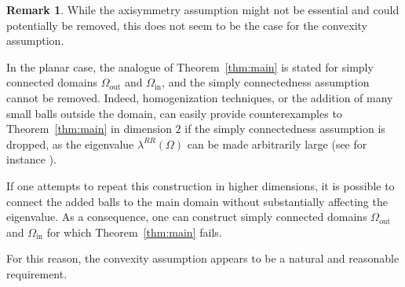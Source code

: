 \documentclass[oneside,a4paper,11pt,notitlepage]{article}
\newcommand{\Hersch}{\mathcal S}
\newcommand{\Simm}{\mathcal A}
\theoremstyle{plain}
\numberwithin{teor}{section}
\numberwithin{equation}{section}
\theoremstyle{definition}
\theoremstyle{plain}
\theoremstyle{plain}
\newtheorem{prop}[prop]{Proposition}
\theoremstyle{plain}
\theoremstyle{plain}
\theoremstyle{definition}
\theoremstyle{definition}
\newtheorem{oss}[oss]{Remark}
\theoremstyle{plain}
\begin{document}
\begin{oss}
While the axisymmetry assumption might not be essential and could potentially be removed, this does not seem to be the case for the convexity assumption.

In the planar case, the analogue of Theorem~\ref{thm:main} is stated for simply connected domains $\Omega_{\mathrm{out}}$ and $\Omega_{\mathrm{in}}$, and the simply connectedness assumption cannot be removed. Indeed, homogenization techniques, or the addition of many small balls outside the domain, can easily provide counterexamples to Theorem~\ref{thm:main} in dimension $2$ if the simply connectedness assumption is dropped, as the eigenvalue $\lambda^{RR}(\Omega)$ can be made arbitrarily large (see for instance \cite{ciormur}).

If one attempts to repeat this construction in higher dimensions, it is possible to connect the added balls to the main domain without substantially affecting the eigenvalue. As a consequence, one can construct simply connected domains $\Omega_{\mathrm{out}}$ and $\Omega_{\mathrm{in}}$ for which Theorem~\ref{thm:main} fails.

For this reason, the convexity assumption appears to be a natural and reasonable requirement.
\end{oss}





\end{document}
